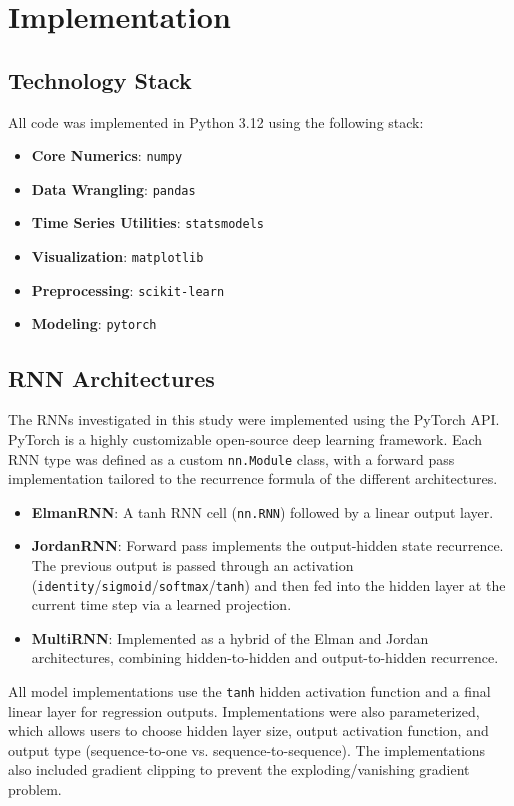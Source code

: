 \documentclass[conference]{IEEEtran}
\begin{document}
\section{\textbf{Implementation}}

\subsection{\textbf{Technology Stack}}
All code was implemented in Python 3.12 using the following stack:
\begin{itemize}
    \item \textbf{Core Numerics}: \texttt{numpy}
    \item \textbf{Data Wrangling}: \texttt{pandas}
    \item \textbf{Time Series Utilities}: \texttt{statsmodels}
    \item \textbf{Visualization}: \texttt{matplotlib}
    \item \textbf{Preprocessing}: \texttt{scikit-learn}
    \item \textbf{Modeling}: \texttt{pytorch}
\end{itemize}

\subsection{\textbf{RNN Architectures}}
The RNNs investigated in this study were implemented using the PyTorch API. PyTorch is a highly customizable open-source deep learning framework. Each RNN type was defined as a custom \texttt{nn.Module} class, with a forward pass implementation tailored to the recurrence formula of the different architectures.
\begin{itemize}
    \item \textbf{ElmanRNN}: A tanh RNN cell (\texttt{nn.RNN}) followed by a linear output layer.
    \item \textbf{JordanRNN}: Forward pass implements the output-hidden state recurrence. The previous output is passed through an activation (\texttt{identity}/\texttt{sigmoid}/\texttt{softmax}/\texttt{tanh}) and then fed into the hidden layer at the current time step via a learned projection.
    \item \textbf{MultiRNN}: Implemented as a hybrid of the Elman and Jordan architectures, combining hidden-to-hidden and output-to-hidden recurrence.
\end{itemize}
All model implementations use the \texttt{tanh} hidden activation function and a final linear layer for regression outputs.
Implementations were also parameterized, which allows users to choose hidden layer size, output activation function, and output type (sequence-to-one vs. sequence-to-sequence). The implementations also included gradient clipping to prevent the exploding/vanishing gradient problem.
\end{document}
